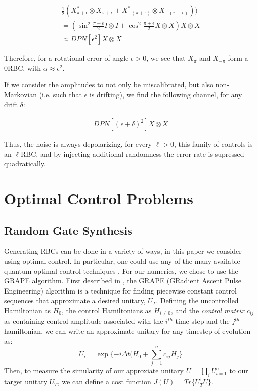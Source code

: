 \documentclass[aps,nofootinbib,pra,notitlepage,twocolumn]{revtex4-1}
\begin{document}
\begin{equation}
  \begin{gathered}
    \frac{1}{2}(X^*_{\pi + \epsilon}\otimes X_{\pi + \epsilon} + X^*_{-(\pi + \epsilon)}\otimes X_{-(\pi + \epsilon)})) \\
    = (\sin^2{\frac{\pi + \epsilon}{2}}I\otimes I + \cos^2{\frac{\pi + \epsilon}{2}}X\otimes X)X\otimes X \\
    \approx DPN[\epsilon^2]X\otimes X
  \end{gathered}
\end{equation}

Therefore, for a rotational error of angle $\epsilon > 0$, we see that $X_\pi$ and  $X_{-\pi}$  form a 0RBC, with $\alpha\approx\epsilon^2$.

If we consider the amplitudes to not only be miscalibrated, but also non-Markovian (i.e. such that $\epsilon$ is drifting), we find the following channel, for any drift $\delta$:

\begin{equation}
  \begin{gathered}
  DPN[(\epsilon + \delta)^2]X\otimes X
  \end{gathered}
\end{equation}

Thus, the noise is always depolarizing, for every $\ell > 0$, this family of controls is an $\ell$RBC, and by injecting additional randomness the error rate is supressed quadratically.

\section{Optimal Control Problems}\label{ocp}
\subsection{Random Gate Synthesis}
 Generating RBCs can be done in a variety of ways, in this paper we consider using optimal control. In particular, one could use any of the many available quantum optimal control techniques \cite{Khaneja2005, Caneva2011, Machnes2018}. For our numerics, we chose to use the GRAPE algorithm. First described in \cite{Khaneja2005}, the GRAPE (GRadient Ascent Pulse Engineering) algorithm is a technique for finding piecewise constant control sequences that approximate a desired unitary, $U_T$. Defining the uncontrolled Hamiltonian as $H_0$, the control Hamiltonians as $H_{i\neq 0}$, and the \textit{control matrix} $c_{ij}$ as containing control amplitude associated with the $i^{th}$ time step and the $j^{th}$ hamiltonian, we can write an approximate unitary for any timestep of evolution as:
\begin{equation}\label{eq:3}
  U_i = \exp\{-i\Delta t(H_0 + \sum_{j=1}^{n}c_{ij}H_{j}\}
\end{equation}
Then, to measure the simularity of our approxiate unitary $U=\prod_iU_{i=1}^n$ to our target unitary $U_T$, we can define a cost function $J(U) = Tr\{U_T^{\dagger}U\}$.
\end{document}
